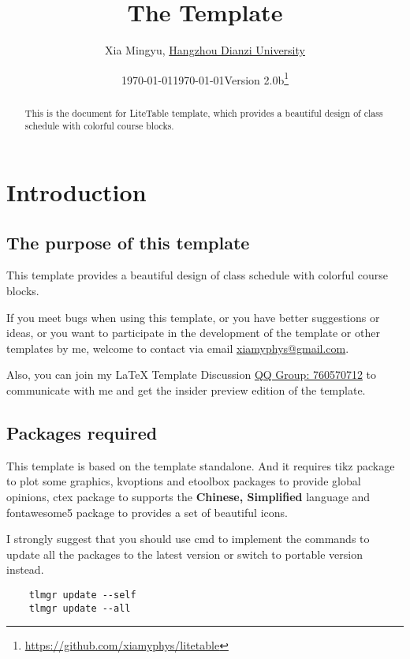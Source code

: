 \documentclass[11pt]{article}
\title{The \pkg{LiteTable} Template}
\author[1]{Xia Mingyu, \href{https://www.hdu.edu.cn}{Hangzhou Dianzi University}}
\date{\today}
\affil[1]{\href{mailto:xiamyphys@gmail.com}{\texttt{xiamyphys@gmail.com}}}
\date{\today\quad Version 2.0b\thanks{%
  \url{https://github.com/xiamyphys/litetable}}}
\makeatletter
\def\@pkg#1{\texorpdfstring{\href{https://www.ctan.org/pkg/#1}%
{\textcolor{pkgcolor}{\textsf{#1}}}}{“#1”}}
\def\s@pkg#1{\texorpdfstring{\textcolor{pkgcolor}{\textsf{#1}}}{“#1”}}
\DeclareRobustCommand\pkg{\@ifstar\s@pkg\@pkg}
\makeatother
\begin{document}
\maketitle

\begin{abstract}
This is the document for \pkg{LiteTable} template, which provides a beautiful design of class schedule with colorful course blocks.

\end{abstract}

\tableofcontents

\section{Introduction}

\subsection{The purpose of this template}
This template provides a beautiful design of class schedule with colorful course blocks.

If you meet bugs when using this template, or you have better suggestions or ideas, or you want to participate in the development of the template or other templates by me, welcome to contact via email \href{mailto:xiamyphys@gmail.com}{xiamyphys@gmail.com}.

Also, you can join my \textsf\LaTeX{} Template Discussion \href{https://qm.qq.com/q/OnHzbNvVAG}{QQ Group: 760570712} to communicate with me and get the insider preview edition of the template.

\subsection{Packages required}
This template is based on the template \pkg{standalone}. And it requires \pkg{tikz} package to plot some graphics, \pkg{kvoptions} and \pkg{etoolbox} packages to provide global opinions, \pkg{ctex} package to supports the \textbf{Chinese, Simplified} language and \pkg{fontawesome5} package to provides a set of beautiful icons.

I strongly suggest that you should use cmd to implement the commands to update all the packages to the latest version or switch to portable version instead.
\begin{verbatim}
    tlmgr update --self
    tlmgr update --all
\end{verbatim}
\end{document}

